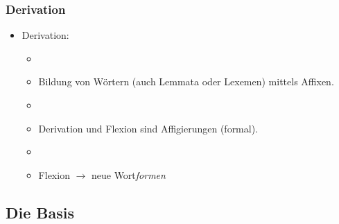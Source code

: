 \begin{frame}
\frametitle{Derivation}

\begin{itemize}
	\item Derivation:
	
	\begin{itemize}
		\item[]
		\item Bildung von Wörtern (auch Lemmata oder Lexemen) mittels Affixen.
		\item []
		\item Derivation und Flexion sind Affigierungen (formal).
		\item[]
		\item Flexion $\rightarrow$ neue Wort\emph{formen}
	\end{itemize}
	
\end{itemize}


\end{frame}



\subsection{Die Basis}


